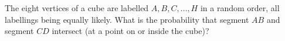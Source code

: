 The eight vertices of a cube are labelled $A,B,C,\dots,H$ in a random order, all labellings being equally likely. What is the probability that segment $AB$ and segment $CD$ intersect (at a point on or inside the cube)?
